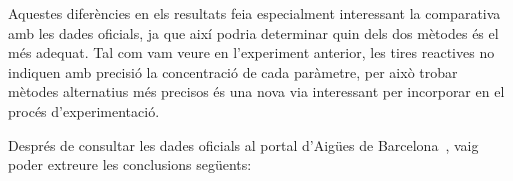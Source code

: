 Aquestes diferències en els resultats feia especialment interessant la comparativa amb les dades oficials, ja que així podria determinar quin dels dos mètodes és el més adequat. Tal com vam veure en l’experiment anterior, les tires reactives no indiquen amb precisió la concentració de cada paràmetre, per això trobar mètodes alternatius més precisos és una nova via interessant per incorporar en el procés d’experimentació.

Després de consultar les dades oficials al portal d’Aigües de Barcelona~\cite{qualitatAigua}, vaig poder extreure les conclusions següents:


\vspace*{2truecm}

